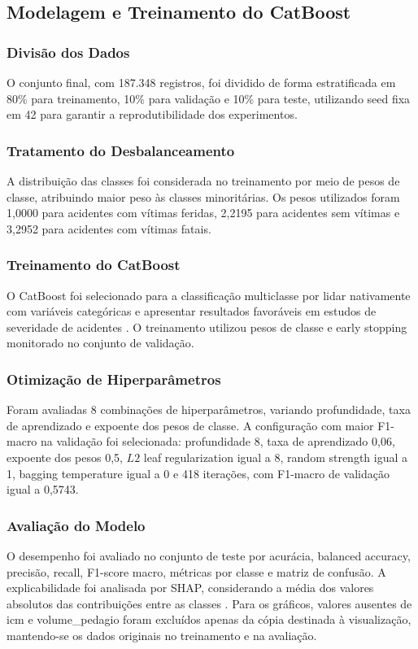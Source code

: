 \documentclass[12pt]{article}
\begin{document}
\subsection{Modelagem e Treinamento do CatBoost}
\subsubsection{Divisão dos Dados}
O conjunto final, com 187.348 registros, foi dividido de forma estratificada em 80\% para treinamento, 10\% para validação e 10\% para teste, utilizando seed fixa em 42 para garantir a reprodutibilidade dos experimentos.

\subsubsection{Tratamento do Desbalanceamento}
A distribuição das classes foi considerada no treinamento por meio de pesos de classe, atribuindo maior peso às classes minoritárias. Os pesos utilizados foram 1,0000 para acidentes com vítimas feridas, 2,2195 para acidentes sem vítimas e 3,2952 para acidentes com vítimas fatais.

\subsubsection{Treinamento do CatBoost}
O CatBoost foi selecionado para a classificação multiclasse por lidar nativamente com variáveis categóricas e apresentar resultados favoráveis em estudos de severidade de acidentes \cite{prokhorenkova2018catboost,samerei2024,xie2025}. O treinamento utilizou pesos de classe e early stopping monitorado no conjunto de validação.

\subsubsection{Otimização de Hiperparâmetros}
Foram avaliadas 8 combinações de hiperparâmetros, variando profundidade, taxa de aprendizado e expoente dos pesos de classe. A configuração com maior F1-macro na validação foi selecionada: profundidade 8, taxa de aprendizado 0,06, expoente dos pesos 0,5, $L2$ leaf regularization igual a 8, random strength igual a 1, bagging temperature igual a 0 e 418 iterações, com F1-macro de validação igual a 0,5743.

\subsubsection{Avaliação do Modelo}
O desempenho foi avaliado no conjunto de teste por acurácia, balanced accuracy, precisão, recall, F1-score macro, métricas por classe e matriz de confusão. A explicabilidade foi analisada por SHAP, considerando a média dos valores absolutos das contribuições entre as classes \cite{lundberg2017}. Para os gráficos, valores ausentes de icm e volume\_pedagio foram excluídos apenas da cópia destinada à visualização, mantendo-se os dados originais no treinamento e na avaliação.
\end{document}
